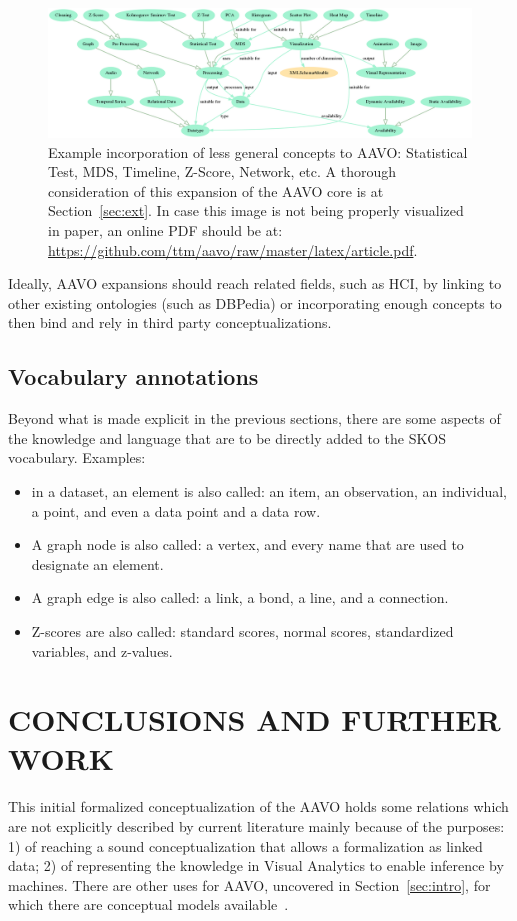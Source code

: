 \documentclass[12pt,fleqn]{article}
\begin{document}
\begin{figure}[!htbp] %
\vspace{-2pt}
\begin{center}
\includegraphics[width=\textwidth]{../figs/aavo0.01_exemplified.png}
    \caption{Example incorporation of less general concepts to AAVO: Statistical Test, MDS, Timeline, Z-Score, Network, etc.
	A thorough consideration of this expansion of the AAVO core is at Section~\ref{sec:ext}.
	In case this image is not being properly visualized in paper,
	an online PDF should be at: \url{https://github.com/ttm/aavo/raw/master/latex/article.pdf}.}
\label{fig:exemp}%
\end{center}
\end{figure}

Ideally, AAVO expansions should reach related fields, such as HCI,
by linking to other existing ontologies (such as DBPedia) or incorporating
enough concepts to then bind and rely in third party conceptualizations.

\subsection{Vocabulary annotations}\label{sec:voc}
Beyond what is made explicit in the previous sections,
there are some aspects of the knowledge and language that
are to be directly added to the SKOS vocabulary.
Examples:
\begin{itemize}
	\item in a dataset, an element is also called: an item, an observation, an individual, a point,
		and even a data point and a data row. 
	\item A graph node is also called: a vertex, and every name that are used to designate an element.
	\item A graph edge is also called: a link, a bond, a line, and a connection.
	\item Z-scores are also called: standard scores, normal scores, standardized variables, and z-values. 
\end{itemize}

\section{CONCLUSIONS AND FURTHER WORK}\label{sec:con}
This initial formalized conceptualization of the AAVO
holds some relations which are not explicitly described by
current literature mainly because of the purposes:
1) of reaching a sound
conceptualization that allows a formalization as linked data;
2) of representing the knowledge in Visual Analytics
to enable inference by machines.
There are other uses for AAVO, uncovered in Section~\ref{sec:intro},
for which there are conceptual models available~\citep{munzner,ward}.
\end{document}
